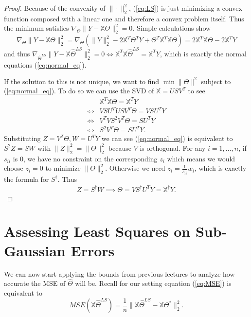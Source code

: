 \documentclass[11pt]{article}
\begin{document}
	\begin{proof}
		Because of the convexity of $ \|\cdot \|_2^2 $, (\ref{eq:LS}) is just minimizing a convex function composed with a linear one and therefore a convex problem itself. Thus the minimum satisfies $ \nabla_\Theta \| Y - \mathbb{X}\Theta \|_2^2 = 0 $. Simple calculations show
		\begin{equation*}
			\nabla_\Theta \| Y - \mathbb{X}\Theta \|_2^2 = \nabla_\Theta (\|Y\|_2^2 - 2\mathbb{X}^T\Theta^T Y + \Theta^T\mathbb{X}^T\mathbb{X}\Theta ) = 2\mathbb{X}^T\mathbb{X}\Theta - 2\mathbb{X}^T Y
		\end{equation*}
	and thus $ \nabla_{\hat \Theta^{LS}} \| Y - \mathbb{X}\hat \Theta^{LS} \|_2^2 = 0 \iff \mathbb{X}^T\mathbb{X} \hat \Theta^{LS} = \mathbb{X}^T Y $, which is exactly the normal equations (\ref{eq:normal_eq}).
	
	If the solution to this is not unique, we want to find $ \min \|\Theta\|^2 $ subject to (\ref{eq:normal_eq}). To do so we can use the SVD of $ \mathbb{X} = USV^T $ to see
	\begin{align*}
		&\mathbb{X}^T\mathbb{X} \Theta = \mathbb{X}^T Y\\
		\iff &VSU^TUSV^T \Theta = VSU^T Y\\
		\iff &V^TVS^2V^T \Theta = SU^T Y\\
		\iff &S^2V^T \Theta = SU^T Y.
	\end{align*}
	Substituting $ Z=V^T\Theta, W=U^TY $ we can see (\ref{eq:normal_eq}) is equivalent to $ S^2Z= SW $ with $ \|Z\|_2^2 = \|\Theta\|_2^2 $ because $ V $ is orthogonal. For any $ i=1,\ldots,n $, if $ s_{ii} $ is $ 0 $, we have no constraint on the corresponding $ z_i $ which means we would choose $ z_i=0 $ to minimize $ \|\Theta\|_2^2 $. Otherwise we need $ z_i = \frac{1}{s_{ii}} w_i $, which is exactly the formula for $ S^\dagger $. Thus
	\begin{align*}
		Z = S^\dagger W \implies \Theta = VS^\dagger U^T Y = \mathbb{X}^\dagger Y.
	\end{align*}
	\end{proof}

	\section{Assessing Least Squares on Sub-Gaussian Errors}
	
	We can now start applying the bounds from previous lectures to analyze how accurate the MSE of $ \hat \Theta $ will be. Recall for our setting equation (\ref{eq:MSE}) is equivalent to 
	\begin{equation}\label{eq:lstsqmse}
		MSE(\mathbb{X}\hat{\Theta}^{LS}) = \frac{1}{n}\|\mathbb{X}\hat{\Theta}^{LS} - \mathbb{X}\Theta^*\|_2^2.
	\end{equation}
	
\end{document}
